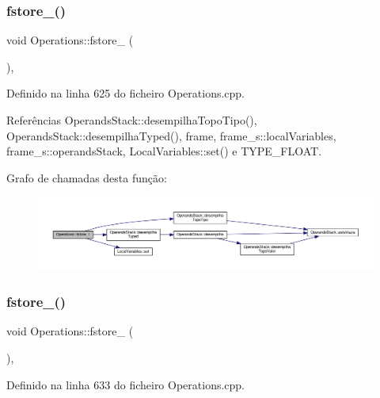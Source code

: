 \subsubsection{\texorpdfstring{fstore\+\_()}{fstore\_1()}}
{\footnotesize\ttfamily void Operations\+::fstore\+\_ (\begin{DoxyParamCaption}{ }\end{DoxyParamCaption})\hspace{0.3cm}{\ttfamily [static]}, {\ttfamily [private]}}



Definido na linha 625 do ficheiro Operations.\+cpp.



Referências Operands\+Stack\+::desempilha\+Topo\+Tipo(), Operands\+Stack\+::desempilha\+Typed(), frame, frame\+\_\+s\+::local\+Variables, frame\+\_\+s\+::operands\+Stack, Local\+Variables\+::set() e T\+Y\+P\+E\+\_\+\+F\+L\+O\+AT.

Grafo de chamadas desta função\+:\nopagebreak
\begin{figure}[H]
\begin{center}
\leavevmode
\includegraphics[width=350pt]{classOperations_a2ea876acd29db9eec798302229bfd5e5_cgraph}
\end{center}
\end{figure}
\mbox{\label{classOperations_a6d0a2faa9f164d49accf491a95364e2f}} 
\subsubsection{\texorpdfstring{fstore\+\_()}{fstore\_2()}}
{\footnotesize\ttfamily void Operations\+::fstore\+\_ (\begin{DoxyParamCaption}{ }\end{DoxyParamCaption})\hspace{0.3cm}{\ttfamily [static]}, {\ttfamily [private]}}



Definido na linha 633 do ficheiro Operations.\+cpp.



